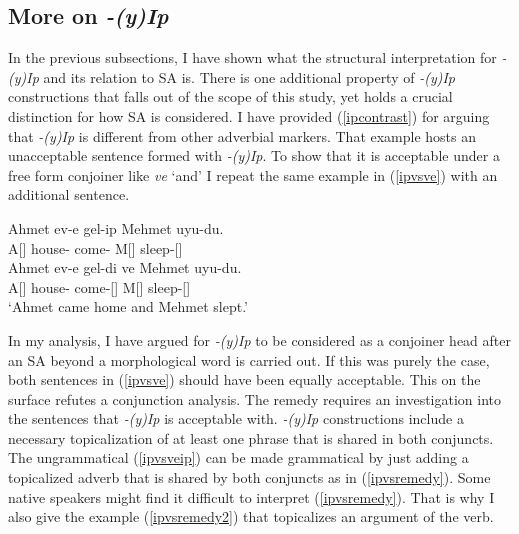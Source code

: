 \subsection{More on \textit{-(y)Ip}} \label{moreonyip}

In the previous subsections, I have shown what the structural interpretation for \textit{-(y)Ip} and its relation to SA is. There is one additional property of \textit{-(y)Ip} constructions that falls out of the scope of this study, yet holds a crucial distinction for how SA is considered. I have provided (\ref{ipcontrast}) for arguing that \textit{-(y)Ip} is different from other adverbial markers. That example hosts an unacceptable sentence formed with \textit{-(y)Ip}. To show that it is acceptable under a free form conjoiner like \textit{ve} `and' I repeat the same example in (\ref{ipvsve}) with an additional sentence.

\begin{exe}
\ex \label{ipvsve}
    \begin{xlist}
        \ex \label{ipvsveip}
        \gll *Ahmet ev-e gel-ip Mehmet uyu-du. \\ 
        A[{\Nom}] house-{\Dat} come-{\Pc} M[{\Nom}] sleep-{\Pst}[{\Tsg}]\\

        \ex \gll Ahmet ev-e gel-di ve Mehmet uyu-du. \\ 
        A[{\Nom}] house-{\Dat} come-{\Pst}[{\Tsg}] {\And} M[{\Nom}] sleep-{\Pst}[{\Tsg}] \\
        \glt `Ahmet came home and Mehmet slept.'
    \end{xlist}
\end{exe}

In my analysis, I have argued for \textit{-(y)Ip} to be considered as a conjoiner head after an SA beyond a morphological word is carried out. If this was purely the case, both sentences in (\ref{ipvsve}) should have been equally acceptable. This on the surface refutes a conjunction analysis. The remedy requires an investigation into the sentences that \textit{-(y)Ip} is acceptable with. \textit{-(y)Ip} constructions include a necessary topicalization of at least one phrase that is shared in both conjuncts. The ungrammatical (\ref{ipvsveip}) can be made grammatical by just adding a topicalized adverb that is shared by both conjuncts as in (\ref{ipvsremedy}). Some native speakers might find it difficult to interpret (\ref{ipvsremedy}). That is why I also give the example (\ref{ipvsremedy2}) that topicalizes an argument of the verb.

